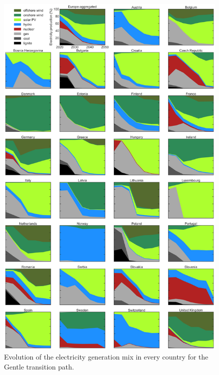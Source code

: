 \documentclass[3p]{elsarticle} %
\begin{document}
\begin{figure}[!h]
\centering
\includegraphics[width=0.8\columnwidth]{../figures/electricity_production_Base_go.png}
\caption{Evolution of the electricity generation mix in every country for the Gentle transition path.} \label{fig_primary_energy} 
\end{figure}
\end{document}
